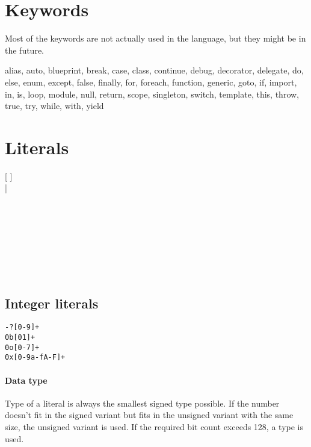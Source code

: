 \section{Keywords} \label{keywords}
Most of the keywords are not actually used in the language, but they might be in the future.
\begin{code}
alias, auto, blueprint, break, case, class, continue, debug, decorator, delegate, do, else, enum, except, false, finally, for, foreach, function, generic, goto, if, import, in, is, loop, module, null, return, scope, singleton, switch, template, this, throw, true, try, while, with, yield
\end{code}

\section{Literals}
\begin{grammar}
	  [  ] \\
		\grAltLn {} |  \\
		\grAltLn {} \\
	  \\
		\grAltLn {} \\
		\grAltLn {} \\
		\grAltLn {} \\
		\grAltLn {} \\
		\grAltLn {} \\
\end{grammar}

\subsection{Integer literals}
\begin{grammar}
	 \verb|-?[0-9]+| \\
	 \verb|0b[01]+| \\
	 \verb|0o[0-7]+| \\
	 \verb|0x[0-9a-fA-F]+|
\end{grammar}

\paragraph{Data type} Type of a literal is always the smallest signed type possible. If the number doesn't fit in the signed variant but fits in the unsigned variant with the same size, the unsigned variant is used. If the required bit count exceeds 128, a  type is used.

